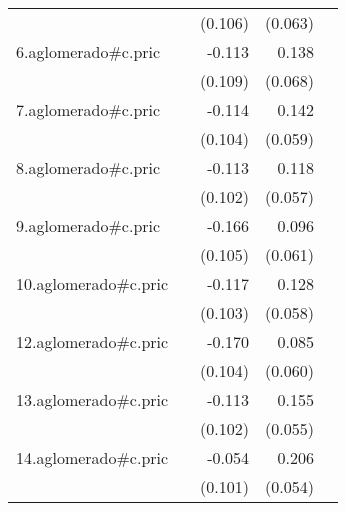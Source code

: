 {\begin{longtable}{l*{4}{D{.}{.}{-1}}}
            &                     &     (0.106)         &     (0.063)         &                     \\
\addlinespace
6.aglomerado#c.pric&                     &      -0.113         &       0.138\sym{*}  &                     \\
            &                     &     (0.109)         &     (0.068)         &                     \\
\addlinespace
7.aglomerado#c.pric&                     &      -0.114         &       0.142\sym{*}  &                     \\
            &                     &     (0.104)         &     (0.059)         &                     \\
\addlinespace
8.aglomerado#c.pric&                     &      -0.113         &       0.118\sym{*}  &                     \\
            &                     &     (0.102)         &     (0.057)         &                     \\
\addlinespace
9.aglomerado#c.pric&                     &      -0.166         &       0.096         &                     \\
            &                     &     (0.105)         &     (0.061)         &                     \\
\addlinespace
10.aglomerado#c.pric&                     &      -0.117         &       0.128\sym{*}  &                     \\
            &                     &     (0.103)         &     (0.058)         &                     \\
\addlinespace
12.aglomerado#c.pric&                     &      -0.170         &       0.085         &                     \\
            &                     &     (0.104)         &     (0.060)         &                     \\
\addlinespace
13.aglomerado#c.pric&                     &      -0.113         &       0.155\sym{**} &                     \\
            &                     &     (0.102)         &     (0.055)         &                     \\
\addlinespace
14.aglomerado#c.pric&                     &      -0.054         &       0.206\sym{***}&                     \\
            &                     &     (0.101)         &     (0.054)         &                     \\

\end{longtable}}
